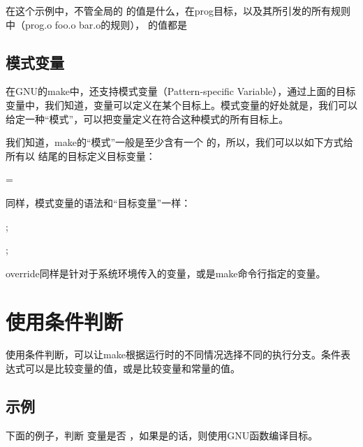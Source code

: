 \documentclass[a4paper,10pt]{sphinxmanual}
\begin{document}
在这个示例中，不管全局的  的值是什么，在prog目标，以及其所引发的所有规则中（prog.o foo.o bar.o的规则），  的值都是 


\section{模式变量}
\label{\detokenize{variables:id9}}
在GNU的make中，还支持模式变量（Pattern-specific Variable），通过上面的目标变量中，我们知道，变量可以定义在某个目标上。模式变量的好处就是，我们可以给定一种“模式”，可以把变量定义在符合这种模式的所有目标上。

我们知道，make的“模式”一般是至少含有一个 \sphinxcode{\sphinxupquote{\%}} 的，所以，我们可以以如下方式给所有以 
结尾的目标定义目标变量：

\begin{sphinxVerbatim}[commandchars=\\\{\}]
  = \PYGZhy{}
\end{sphinxVerbatim}

同样，模式变量的语法和“目标变量”一样：

\begin{sphinxVerbatim}[commandchars=\\\{\}]
 \PYGZlt{}\PYGZhy{}\PYGZgt{};

  \PYGZlt{}\PYGZhy{}\PYGZgt{};
\end{sphinxVerbatim}

override同样是针对于系统环境传入的变量，或是make命令行指定的变量。


\chapter{使用条件判断}
\label{\detokenize{conditionals:id1}}\label{\detokenize{conditionals::doc}}
使用条件判断，可以让make根据运行时的不同情况选择不同的执行分支。条件表达式可以是比较变量的值，或是比较变量和常量的值。


\section{示例}
\label{\detokenize{conditionals:id2}}
下面的例子，判断  变量是否  ，如果是的话，则使用GNU函数编译目标。
\end{document}
